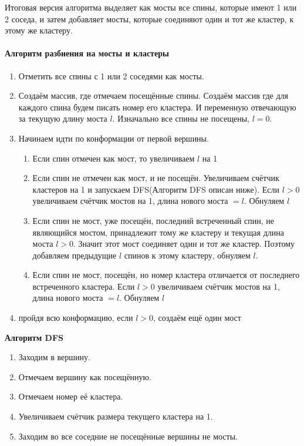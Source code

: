 Итоговая версия алгоритма выделяет как мосты все спины, которые имеют 1 или 2 соседа, и затем добавляет мосты, которые соединяют один и тот же кластер, к этому же кластеру.

\paragraph{Алгоритм разбиения на мосты и кластеры}
\begin{enumerate}
	\item Отметить все спины с 1 или 2 соседями как мосты.
	\item Создаём массив, где отмечаем посещённые спины. Создаём массив где для каждого спина будем писать номер его кластера. И переменную отвечающую за текущую длину моста $l$. Изначально все спины не посещены, $l = 0$.
	\item Начинаем идти по конформации от первой вершины.
	\begin{enumerate}
	
		\item Если спин отмечен как мост, то увеличиваем $l$ на 1
		\item Если спин не отмечен как мост, и не посещён. Увеличиваем счётчик кластеров на 1 и запускаем DFS(Алгоритм DFS описан ниже). Если $l > 0$ увеличиваем счётчик мостов на 1, длина нового моста $= l$. Обнуляем $l$
		\item Если спин не мост, уже посещён, последний встреченный спин, не являющийся мостом, принадлежит тому же кластеру и текущая длина моста $l > 0$. Значит этот мост соединяет один и тот же кластер. Поэтому добавляем предыдущие $l$ спинов к этому кластеру, обнуляем $l$.
		\item Если спин не мост, посещён, но номер кластера отличается от последнего встреченного кластера. Если $l > 0$ увеличиваем счётчик мостов на 1, длина нового моста $= l$. Обнуляем $l$
	\end{enumerate}
	\item пройдя всю конформацию, если $l > 0$, создаём ещё один мост
\end{enumerate}

\textbf{Алгоритм DFS}
\begin{enumerate}
	\item Заходим в вершину.
	\item Отмечаем вершину как посещённую.
	\item Отмечаем номер её кластера.
	\item Увеличиваем счётчик размера текущего кластера на 1.
	\item Заходим во все соседние не посещённые вершины не мосты.
\end{enumerate}

